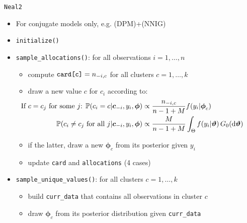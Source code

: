 \begin{frame}[fragile]{\texttt{Neal2}} %
	\begin{itemize}
		\item For conjugate models only, e.g. (DPM)+(NNIG)
		\item \verb|initialize()|
		\item \verb|sample_allocations()|: for all observations $i=1,\dots,n$
		\begin{itemize}
			\item compute $\verb|card[c]| = n_{-i,c}$ for all clusters $c=1,\dots,k$
			\item draw a new value $c$ for $c_i$ according to:
			\begin{align*}
				\hspace{-30pt}
				\text{If $c=c_j$ for some $j$: }
				\PP(c_{i}=c | \boldsymbol c_{-i}, y_{i},\boldsymbol\phi) &\propto \frac{n_{-i,c} }{n-1+M} f(y_{i}|\boldsymbol\phi_{c}) \\
				\PP(c_{i}\neq c_{j} \text{ for all } j | \boldsymbol c_{-i}, y_{i},\boldsymbol\phi) &\propto \frac{M }{n-1+M} \int_{\Theta} f(y_{i}|\boldsymbol\theta) \, G_0(\de\boldsymbol\theta)
			\end{align*}
			\item if the latter, draw a new $\boldsymbol\phi_c$ from its posterior given $y_i$
			\item update \verb|card| and \verb|allocations| (4 cases)
		\end{itemize}
		\item \verb|sample_unique_values()|: for all clusters $c = 1,\dots,k$
		\begin{itemize}
			\item build \verb|curr_data| that contains all observations in cluster $c$
			\item draw $\boldsymbol\phi_c$ from its posterior distribution given \verb|curr_data|
		\end{itemize}
	\end{itemize}
\end{frame}
